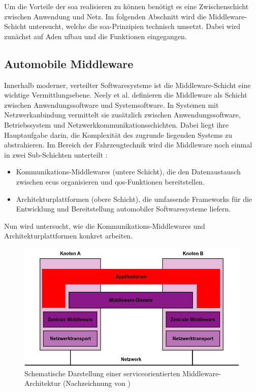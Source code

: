 Um die Vorteile der \gls{soa} realisieren zu können benötigt es eine Zwischenschicht zwischen Anwendung und Netz. Im folgenden Abschnitt wird die Middleware-Schicht untersucht, welche die \gls{soa}-Prinzipien technisch umsetzt. Dabei wird zunächst auf Aden ufbau und die Funktionen eingegangen.

\subsection{Automobile Middleware}
\label{subsect:middle}
Innerhalb moderner, verteilter Softwaresysteme ist die Middleware-Schicht eine wichtige Vermittlungsebene. Neely et al. \cite{neely2006adaptive} definieren die Middleware als Schicht zwischen Anwendungssoftware und Systemsoftware. In Systemen mit Netzwerkanbindung vermittelt sie zusätzlich zwischen Anwendungssoftware, Betriebssystem und Netzwerkkommunikationsschichten. Dabei liegt ihre Hauptaufgabe darin, die Komplexität des zugrunde liegenden Systems zu abstrahieren. Im Bereich der Fahrzeugtechnik wird die Middleware noch einmal in zwei Sub-Schichten unterteilt \cite{kluner2024moderna}:
\begin{itemize}
  \item Kommunikations-Middlewares (untere Schicht), die den Datenaustausch zwischen \glspl{ecu} organisieren und \gls{qos}-Funktionen bereitstellen.
  \item Architekturplattformen (obere Schicht), die umfassende Frameworks für die Entwicklung und Bereitstellung automobiler Softwaresysteme liefern.
\end{itemize}
Nun wird untersucht, wie die Kommunikations-Middlewares und Architekturplattformen konkret arbeiten.

\begin{figure}[h!]
  \centering
  \includegraphics[width=\textwidth]{figures/02Grundlagen/Middleware_Scheme.drawio.png}
  \caption{Schematische Darstellung einer serviceorientierten Middleware-Architektur (Nachzeichnung von \cite{neely2006adaptive})}
  \label{fig:middleware}
\end{figure}

